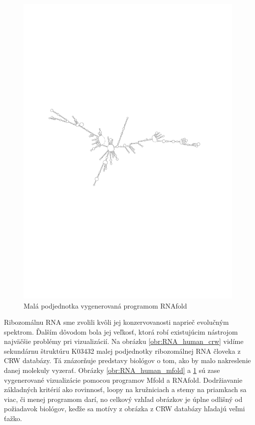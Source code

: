 \begin{figure}
  \centering
  \includegraphics[clip, trim=2.5cm 10cm 3cm 10cm, angle=90, width=1\textwidth]{../img/human_RNAfold}
  \caption{Malá podjednotka vygenerovaná programom RNAfold }
  \label{obr:RNA_human_rnafold}
\end{figure}

Ribozomálnu RNA sme zvolili kvôli jej konzervovanosti naprieč evolučným spektrom. Ďalším
dôvodom bola jej veľkosť, ktorá robí existujúcim nástrojom najväčšie problémy
pri vizualizácií. Na obrázku \ref{obr:RNA_human_crw} vidíme sekundárnu štruktúru 
K03432 malej podjednotky ribozomálnej RNA človeka z CRW databázy.
Tá znázorňuje predstavy biológov o tom, ako by malo nakreslenie danej molekuly vyzerať.
Obrázky \ref{obr:RNA_human_mfold} a \ref{obr:RNA_human_rnafold} sú zase vygenerované
vizualizácie pomocou programov Mfold a RNAfold.
Dodržiavanie základných kritérií ako rovinnosť, loopy na kružniciach a stemy na priamkach
sa viac, či menej programom darí, no celkový vzhľad obrázkov je úplne odlišný od požiadavok
biológov, keďže sa motívy z obrázka z CRW databázy hľadajú veľmi ťažko.

